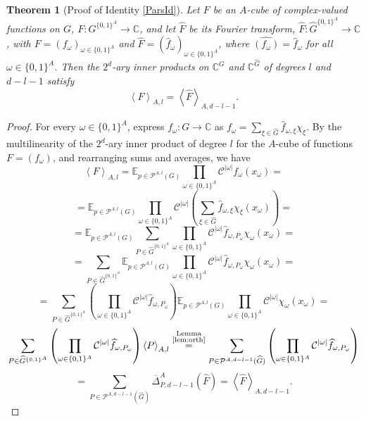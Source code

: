 \documentclass{amsart}
\newtheorem{theorem}{Theorem}[section]
\theoremstyle{definition}
\theoremstyle{remark}
\numberwithin{equation}{section}
\begin{document}
\begin{theorem}[Proof of Identity \eqref{ParsId}]
\label{thm:f=fhat}
Let $F$ be an $A$-cube of complex-valued functions on $G$, $F: G^{\{0,1\}^A} \to \mathbb{C}$, and let $\widehat{F}$ be its Fourier transform, $\widehat{F}: \widehat{G}^{\{0,1\}^A} \to \mathbb{C}$, with $F=\left( f_\omega\right)_{\omega \in \{0,1\}^A}$ and $\widehat{F}=\left( \widehat{f}_\omega\right)_{\omega \in \{0,1\}^A}$, where  $\widehat{(f_\omega)} = \widehat{f}_\omega$ for all $\omega \in \{0,1\}^A$. Then the $2^d$-ary inner products on $\mathbb{C}^G$ and $\mathbb{C}^{\widehat{G}}$ of degrees $l$ and $d-l-1$ satisfy 
$$\left\langle F \right\rangle_{A,l} =  \left\langle \widehat{F}
\right\rangle_{A,d-l-1} .
$$
\end{theorem}
\begin{proof}
For every $\omega \in \{0,1\}^A$, express $f_\omega : G \to \mathbb{C}$ as $f_\omega =\sum_{\xi \in \widehat{G}} \widehat{f}_{\omega, \xi} \chi_\xi$. By the multilinearity of the $2^d$-ary inner product of degree $l$ for the $A$-cube of functions $F = \left( f_\omega\right)$,  and rearranging sums and averages, we have 
$$ \left\langle F \right\rangle_{A,l} = \mathbb{E}_{p \in \mathcal{P}^{A,l}(G)}  \prod_{\omega \in \{0,1\}^A} \mathcal{C}^{|\omega|} f_\omega (x_\omega) =$$
$$ = \mathbb{E}_{p \in \mathcal{P}^{A,l}(G)}  \prod_{\omega \in \{0,1\}^A} \mathcal{C}^{|\omega|} \left( \sum_{\xi \in \widehat{G}} \widehat{f}_{\omega, \xi} \chi_\xi(x_\omega) \right) =$$
$$= \mathbb{E}_{p \in \mathcal{P}^{A,l}(G)} \sum_{ P \in {\widehat{G}}^{\{0,1\}^A}}   \prod_{\omega \in \{0,1\}^A} \mathcal{C}^{|\omega|} \widehat{f}_{\omega, P_\omega} \chi_\omega(x_\omega) =$$
$$=\sum_{P \in {\widehat{G}}^{\{0,1\}^A}} \mathbb{E}_{p \in \mathcal{P}^{A,l}(G)}
\prod_{\omega \in \{0,1\}^A} \mathcal{C}^{|\omega|} \widehat{f}_{\omega, P_\omega} \chi_\omega(x_\omega)=
$$
$$=\sum_{P \in {\widehat{G}}^{\{0,1\}^A}} 
\left(\prod_{\omega \in \{0,1\}^A} \mathcal{C}^{|\omega|} \widehat{f}_{\omega, P_\omega}\right)\mathbb{E}_{p \in \mathcal{P}^{A,l}(G)} \prod_{\omega \in \{0,1\}^A} \mathcal{C}^{|\omega|} \chi_\omega(x_\omega)=
$$
$$ \sum_{P \in {\widehat{G}}^{\{0,1\}^A}} \left(\prod_{\omega \in \{0,1\}^A} \mathcal{C}^{|\omega|}\widehat{f}_{\omega, P_\omega}\right)  \left\langle P \right\rangle_{A,l}  \overset{\substack{\text{Lemma} \\ \text{\ref{lem:orth}}}}= 
\sum_{P \in \mathcal{P}^{A,d-l-1}(\widehat{G})} \left(\prod_{\omega \in \{0,1\}^A} \mathcal{C}^{|\omega|}\widehat{f}_{\omega, P_\omega}\right)  $$
$$ = \sum_{P \in \mathcal{P}^{A,d-l-1}(\widehat{G})} \overline{\Delta}^A_{P, d-l-1} (\widehat{F}) =
 \left\langle \widehat{F} \right\rangle_{A,d-l-1}.$$
\end{proof}
\end{document}
